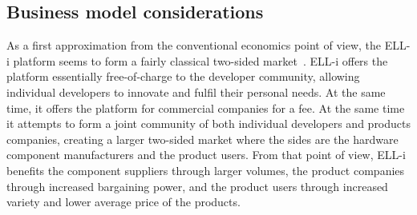 \documentclass[final]{siamltex}
\begin{document}
%
%
%
%
\subsection{Business model considerations}

As a first approximation from the conventional economics point of
view, the ELL-i platform seems to form a fairly classical two-sided
market~\cite{rochet2003platform}.  ELL-i offers the platform
essentially free-of-charge to the developer community, allowing
individual developers to innovate and fulfil their personal needs.  At
the same time, it offers the platform for commercial companies for a
fee.  At the same time it attempts to form a joint community
of both individual developers and products companies, creating a
larger two-sided market where the sides are the hardware component
manufacturers and the product users.  From that point of view, ELL-i
benefits the component suppliers through larger volumes, the product
companies through increased bargaining power, and the product users
through increased variety and lower average price of the products.  
\end{document}

